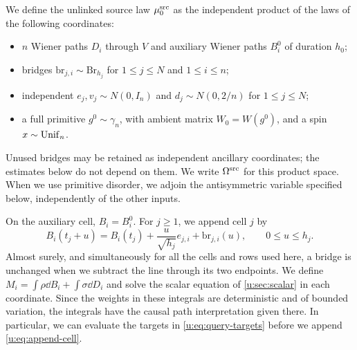 We define the unlinked source law $\mu^{\rm src}_0$ as the independent product
of the laws of the following coordinates:
\begin{itemize}
\item $n$ Wiener paths $D_i$ through $V$ and auxiliary Wiener paths
 $B_i^0$ of duration $h_0$;
\item bridges $\mathrm{br}_{j,i}\sim\mathrm{Br}_{h_j}$ for
 $1\le j\le N$ and $1\le i\le n$;
\item independent $e_j,v_j\sim N(0,I_n)$ and $d_j\sim N(0,2/n)$
 for $1\le j\le N$;
\item a full primitive $g^0\sim\gamma_n$, with ambient matrix
 $W_0=W(g^0)$, and a spin $x\sim\operatorname{Unif}_n$.
\end{itemize}
Unused bridges may be retained as independent ancillary coordinates;
the estimates below do not depend on them. We write $\Omega^{\rm src}$
for this product space. When we use primitive disorder, we adjoin the
antisymmetric variable specified below, independently of the other inputs.

On the auxiliary cell, $B_i=B_i^0$. For $j\ge1$, we append cell $j$ by
\begin{equation}\label{u:eq:append-cell}
 B_i(t_j+u)=B_i(t_j)+\frac{u}{\sqrt{h_j}}e_{j,i}
                    +\mathrm{br}_{j,i}(u),\qquad 0\le u\le h_j.
\end{equation}
Almost surely, and simultaneously for all the cells and rows used here,
a bridge is unchanged when we subtract the line through its two endpoints. We define $M_i=\int\rho\dd B_i+\int\sigma\dd D_i$ and solve the
scalar equation of \cref{u:sec:scalar} in each coordinate. Since the weights in these integrals are deterministic and of bounded
variation, the integrals have the causal path interpretation given
there. In particular, we can evaluate the targets in
\eqref{u:eq:query-targets} before we append \eqref{u:eq:append-cell}.

